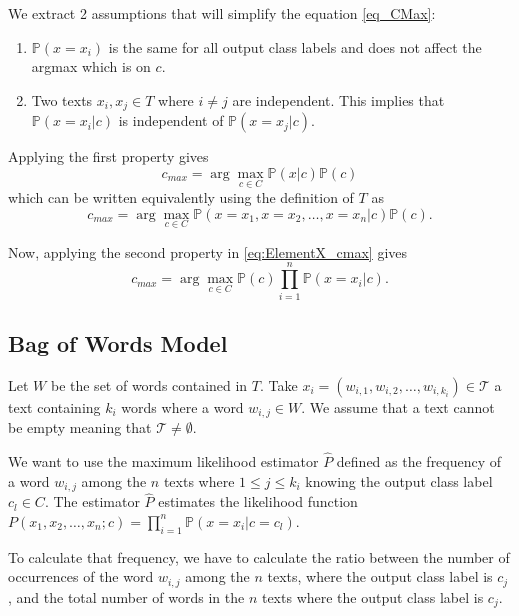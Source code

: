 \documentclass{article}
\begin{document}
We extract 2 assumptions that will simplify the equation \eqref{eq_CMax}:
\begin{enumerate}
	\item $\mathbb{P}(x = x_i)$ is the same for all output class labels and does not affect the argmax which is on $c$.
	\item Two texts $x_i, x_j \in T$ where $i \neq j$ are independent. This implies that $\mathbb{P}(x = x_i | c)$ is independent of $\mathbb{P}(x = x_j | c)$.
\end{enumerate}

Applying the first property gives
\begin{equation}
	c_{max} = \arg\max_{c \in C} \mathbb{P}(x | c)\mathbb{P}(c)
\end{equation}
which can be written equivalently using the definition of $T$ as
\begin{equation} \label{eq:ElementX_cmax}
c_{max} = \arg\max_{c \in C} \mathbb{P}(x = x_1, x = x_2, \ldots, x = x_n | c)\mathbb{P}(c).
\end{equation}

Now, applying the second property in \eqref{eq:ElementX_cmax} gives
\begin{equation}
	c_{max} = \arg\max_{c \in C} \mathbb{P}(c) \prod\limits_{i = 1}^n \mathbb{P}(x = x_i | c).
\end{equation}


\subsection{Bag of Words Model}
Let $W$ be the set of words contained in $T$. Take $x_i = (w_{i,1}, w_{i,2}, \ldots, w_{i,k_i}) \in \mathcal{T}$ a text containing $k_i$ words where a word $w_{i,j} \in W$. We assume that a text cannot be empty meaning that $\mathcal{T} \neq \emptyset$.

We want to use the maximum likelihood estimator $\widehat{P}$ defined as the frequency of a word $w_{i,j}$ among the $n$ texts where $1 \leq j \leq k_i$ knowing the output class label $c_l \in C$. The estimator $\widehat{P}$ estimates the likelihood function $P(x_1,x_2,\ldots,x_n ; c) = \prod\limits_{i=1}^n \mathbb{P}(x = x_i | c = c_l)$.

To calculate that frequency, we have to calculate the ratio between the number of occurrences of the word $w_{i,j}$ among the $n$ texts, where the output class label is $c_j$, and the total number of words in the $n$ texts where the output class label is $c_j$.
\end{document}
